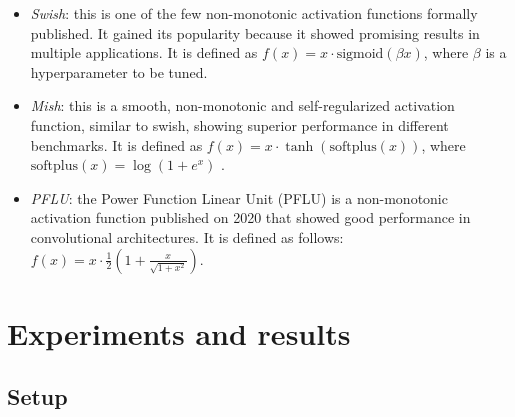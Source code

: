 \documentclass[authoryear]{elsarticle}
\begin{document}
\begin{itemize}
	\item \textit{Swish}: this is one of the few non-monotonic activation functions formally published. It gained its popularity because it showed promising results in multiple applications. It is defined as $f(x) = x \cdot \text{sigmoid}(\beta x)$, where $\beta$ is a hyperparameter to be tuned.
	\item \textit{Mish}: this is a smooth, non-monotonic and self-regularized activation function, similar to swish, showing superior performance in different benchmarks. It is defined as $f(x) = x \cdot \tanh (\text{softplus} (x))$, where $\text{softplus} (x) = \log(1+e^x)$ \citep{dugas2001}.
	\item \textit{PFLU}: the Power Function Linear Unit (PFLU) is a non-monotonic activation function published on 2020 that showed good performance in convolutional architectures. It is defined as follows: $f(x) = x \cdot \frac{1}{2} \left( 1 + \frac{x}{\sqrt{1+x^2}} \right)$.
	
\end{itemize}

\section{Experiments and results} \label{sec:experiments}
\subsection{Setup}
\end{document}
